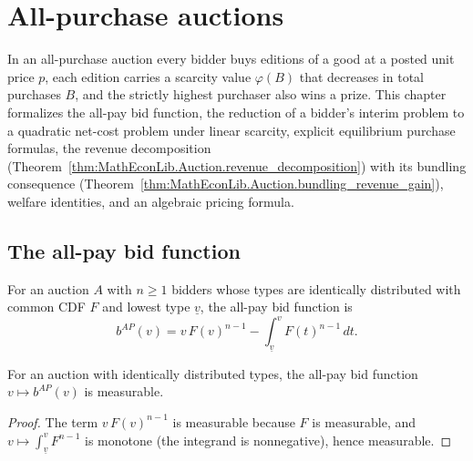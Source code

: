 \chapter{All-purchase auctions}

In an all-purchase auction every bidder buys editions of a good at a posted unit price $p$, each edition carries a scarcity value $\varphi(B)$ that decreases in total purchases $B$, and the strictly highest purchaser also wins a prize. This chapter formalizes the all-pay bid function, the reduction of a bidder's interim problem to a quadratic net-cost problem under linear scarcity, explicit equilibrium purchase formulas, the revenue decomposition (Theorem~\ref{thm:MathEconLib.Auction.revenue_decomposition}) with its bundling consequence (Theorem~\ref{thm:MathEconLib.Auction.bundling_revenue_gain}), welfare identities, and an algebraic pricing formula.

\section{The all-pay bid function}

\begin{definition}\label{def:MathEconLib.Auction.allPayBid}
\leanok
{}
For an auction $A$ with $n \ge 1$ bidders whose types are identically distributed with common CDF $F$ and lowest type $\underline v$, the all-pay bid function is
\[
  b^{AP}(v) = v\,F(v)^{n-1} - \int_{\underline v}^{v} F(t)^{n-1}\,dt .
\]
\end{definition}

\begin{lemma}\label{thm:MathEconLib.Auction.allPayBid_measurable}
\leanok
{}
For an auction with identically distributed types, the all-pay bid function $v \mapsto b^{AP}(v)$ is measurable.
\end{lemma}
\begin{proof}
\leanok
{}
The term $v\,F(v)^{n-1}$ is measurable because $F$ is measurable, and $v \mapsto \int_{\underline v}^{v} F^{n-1}$ is monotone (the integrand is nonnegative), hence measurable.
\end{proof}

